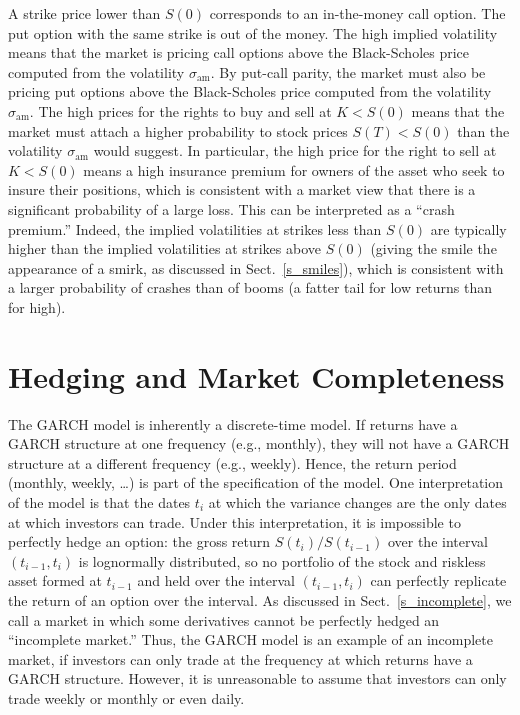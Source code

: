A strike price lower than $S(0)$ corresponds to an in-the-money call option.  The put option with the same strike is out of the money.  The high implied volatility means that the market is pricing call options  above the Black-Scholes price computed from the volatility $\sigma_\text{am}$.  By put-call parity, the market must also be pricing put options above the Black-Scholes price computed from the  volatility $\sigma_\text{am}$.  The high prices for the rights to buy and sell at $K<S(0)$ means that the market must attach a higher probability to stock prices $S(T)<S(0)$ than the volatility $\sigma_\text{am}$ would suggest.  In particular, the high price for the right to sell at $K<S(0)$ means a high insurance premium for owners of the asset who seek to insure their positions, which is consistent with a market view that there is a significant probability of a large loss.  This can be interpreted as a ``crash premium.''   Indeed, the implied volatilities at strikes less than $S(0)$  are typically higher than the implied volatilities at strikes above $S(0)$ (giving the smile the appearance of a smirk, as discussed in Sect.~\ref{s_smiles}), which is consistent with a larger probability of crashes than of booms (a fatter tail for low returns than for high).



\section{Hedging and Market Completeness}

The GARCH model is inherently a discrete-time model.  If returns have a GARCH structure at one frequency (e.g., monthly), they will not have a GARCH structure at a different frequency (e.g., weekly).  Hence, the return period (monthly, weekly, \ldots) is part of the specification of the model.  One interpretation of the model is that the dates $t_i$ at which the variance changes are the only dates at which investors can trade.  Under this interpretation, it is impossible to perfectly hedge an option: the gross return $S(t_i)/S(t_{i-1})$ over the interval $(t_{i-1},t_i)$ is lognormally distributed, so no portfolio of the stock and riskless asset formed at $t_{i-1}$ and held over the interval $(t_{i-1},t_i)$ can perfectly replicate the return of an option over the interval.  As discussed in Sect.~\ref{s_incomplete}, we call a market in which some derivatives cannot be perfectly hedged an ``incomplete market.''   Thus, the GARCH model is an example of an incomplete market, if investors can only trade at the frequency at which returns have a GARCH structure.  However, it is unreasonable to assume that investors can only trade weekly or monthly or even daily.


